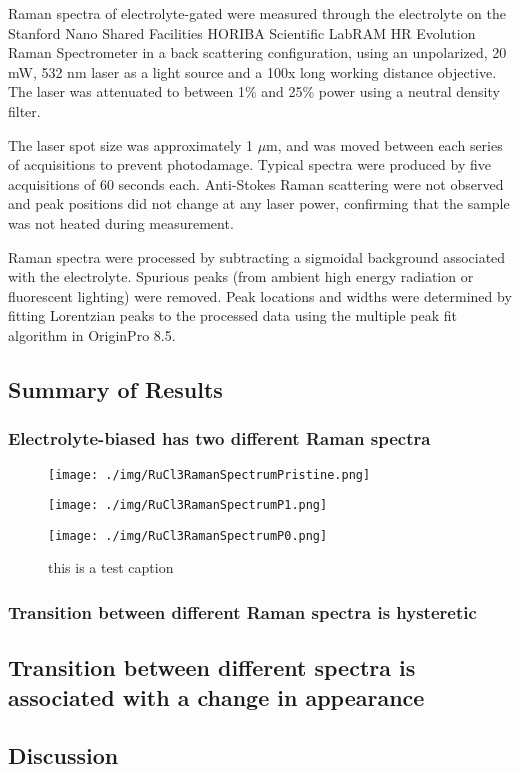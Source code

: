 Raman spectra of electrolyte-gated \rucl were measured through the electrolyte on the Stanford Nano Shared Facilities HORIBA Scientific LabRAM HR Evolution Raman Spectrometer in a back scattering configuration, using an unpolarized, 20 mW, 532 nm laser as a light source and a 100x long working distance objective. The laser was attenuated to between 1\% and 25\% power using a neutral density filter.

The laser spot size was approximately 1 $\mu$m, and was moved between each series of acquisitions to prevent photodamage. Typical spectra were produced by five acquisitions of 60 seconds each. Anti-Stokes Raman scattering were not observed and peak positions did not change at any laser power, confirming that the sample was not heated during measurement.

Raman spectra were processed by subtracting a sigmoidal background associated with the electrolyte. Spurious peaks (from ambient high energy radiation or fluorescent lighting) were removed. Peak locations and widths were determined by fitting Lorentzian peaks to the processed data using the multiple peak fit algorithm in OriginPro 8.5.

\subsection{Summary of Results}

\subsubsection{Electrolyte-biased \rucl has two different Raman spectra}

\begin{figure}[h]
	\begin{minipage}{0.5\textwidth}
		\texttt{[image: ./img/RuCl3RamanSpectrumPristine.png]}
	\end{minipage}
	\hspace{\fill}
	\begin{minipage}{0.5	\textwidth}
		\texttt{[image: ./img/RuCl3RamanSpectrumP1.png]}
	\end{minipage}
	
	\vspace*{1cm}
	
	\begin{minipage}{0.5	\textwidth}
		\texttt{[image: ./img/RuCl3RamanSpectrumP0.png]}
	\end{minipage}
	\begin{minipage}{0.47	\textwidth}
		\caption{this is a test caption}
	\end{minipage}
	
\end{figure}

\subsubsection{Transition between different Raman spectra is hysteretic}

\subsection{Transition between different spectra is associated with a change in appearance}
\subsection{Discussion}